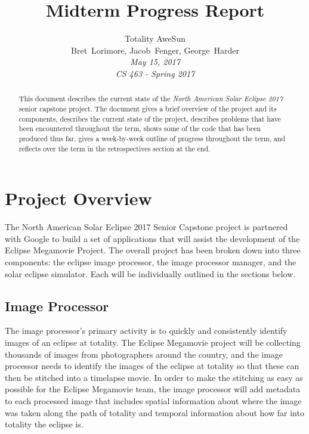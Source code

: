 \documentclass[10pt, onecolumn, draftclsnofoot, letterpaper, compsoc]{IEEEtran}
\title{Midterm Progress Report}
\author{Totality AweSun \\
		Bret~Lorimore, Jacob~Fenger, George~Harder \\
		\textit{May 15, 2017 \\
		CS 463 - Spring 2017}}
\begin{document}
\maketitle

\begin{abstract}
This document describes the current state of the \textit{North American Solar Eclipse 2017}
senior capstone project. The document gives a brief overview of the project and its components,
describes the current state of the project, describes problems that have been
encountered throughout the term, shows some of the code that has been produced thus far, gives
a week-by-week outline of progress throughout the term, and reflects over the term in the
retrospectives section at the end.
\end{abstract}

\newpage

\tableofcontents

\newpage

\section{Project Overview}

The North American Solar Eclipse 2017 Senior Capstone project is partnered
with Google to build a set of applications that will assist the development of
the Eclipse Megamovie Project. The overall project has been broken down into
three components: the eclipse image processor, the image processor manager, and
the solar eclipse simulator. Each will be individually outlined in the sections
below. \\

\subsection{Image Processor}

The image processor’s primary activity is to quickly and consistently identify
images of an eclipse at totality. The Eclipse Megamovie project will be
collecting thousands of images from photographers around the country, and the
image processor needs to identify the images of the eclipse at totality so that
these can then be stitched into a timelapse movie. In order to make the
stitching as easy as possible for the Eclipse Megamovie team, the image
processor will add metadata to each processed image that includes spatial
information about where the image was taken along the path of totality and
temporal information about how far into totality the eclipse is.
\end{document}
